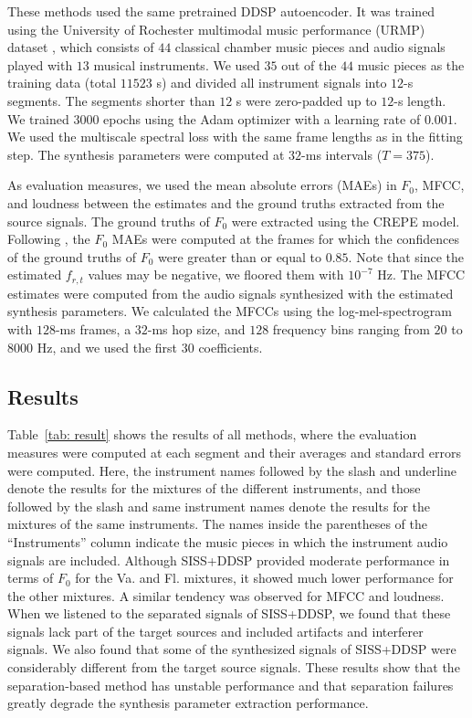 \documentclass{article}
\begin{document}
These methods used the same pretrained DDSP autoencoder.
It was trained using the University of Rochester multimodal music performance (URMP) dataset \cite{urmp}, which consists of $44$ classical chamber music pieces and audio signals played with $13$ musical instruments.
We used $35$ out of the $44$ music pieces as the training data (total $11523$ s) and divided all instrument signals into $12$-s segments.
The segments shorter than $12$ s were zero-padded up to $12$-s length.
We trained $3000$ epochs using the Adam optimizer with a learning rate of $0.001$. We used the multiscale spectral loss with the same frame lengths as in the fitting step.
The synthesis parameters were computed at $32$-ms intervals ($T=375$).

As evaluation measures, we used the mean absolute errors (MAEs) in $F_0$, MFCC, and loudness between the estimates and the ground truths extracted from the source signals.
The ground truths of $F_0$ were extracted using the CREPE model.
Following \cite{ddsp_ref}, the $F_0$ MAEs were computed at the frames for which the confidences of the ground truths of $F_0$ were greater than or equal to $0.85$.
Note that since the estimated $f_{r,t}$ values may be negative, we floored them with $10^{-7}$ Hz. The MFCC estimates were computed from the audio signals synthesized with the estimated synthesis parameters.
We calculated the MFCCs using the log-mel-spectrogram with $128$-ms frames, a $32$-ms hop size, and $128$ frequency bins ranging from $20$ to $8000$ Hz, and we used the first $30$ coefficients.

\subsection{Results}
Table~\ref{tab: result} shows the results of all methods, where the evaluation measures were computed at each segment and their averages and standard errors were computed.
Here, the instrument names followed by the slash and underline denote the results for the mixtures of the different instruments, and those followed by the slash and same instrument names denote the results for the mixtures of the same instruments.
The names inside the parentheses of the ``Instruments'' column indicate the music pieces in which the instrument audio signals are included.
Although SISS+DDSP provided moderate performance in terms of $F_0$ for the Va. and Fl. mixtures, it showed much lower performance for the other mixtures. A similar tendency was observed for MFCC and loudness.
When we listened to the separated signals of SISS+DDSP, we found that these signals lack part of the target sources and included artifacts and interferer signals.
We also found that some of the synthesized signals of SISS+DDSP were considerably different from the target source signals.
These results show that the separation-based method has unstable performance and that separation failures greatly degrade the synthesis parameter extraction performance.
\end{document}
